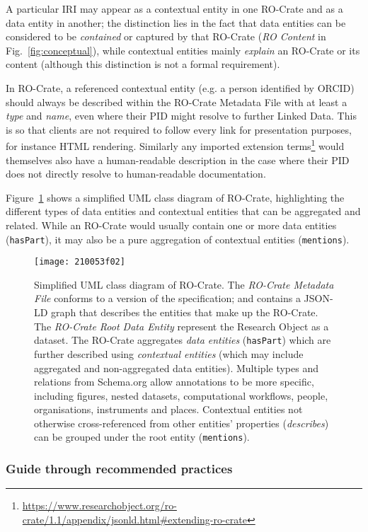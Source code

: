 \documentclass[ds,v1.1.2,openaccess]{iosart2x}%
\begin{document}
A particular IRI may appear as a contextual entity in one RO-Crate and
as a data entity in another; the distinction lies in the fact that data
entities can be considered to be \textit{contained} or captured by that
RO-Crate (\textit{RO Content} in Fig.~\ref{fig:conceptual}), while
contextual entities mainly \textit{explain} an RO-Crate or its content
(although this distinction is not a formal requirement).

In RO-Crate, a referenced contextual entity (e.g. a person identified
by ORCID) should always be described within the RO-Crate Metadata File
with at least a \textit{type} and \textit{name}, even where their PID might resolve
to further Linked Data. This is so that clients are not required to
follow every link for presentation purposes, for instance HTML
rendering. Similarly any imported extension
terms\footnote{\url{https://www.researchobject.org/ro-crate/1.1/appendix/jsonld.html\#extending-ro-crate}}
would themselves also have a human-readable description in the case
where their PID does not directly resolve to human-readable documentation.

Figure~\ref{fig:uml} shows a simplified UML class diagram of RO-Crate,
highlighting the different types of data entities and contextual
entities that can be aggregated and related. While an RO-Crate would
usually contain one or more data entities (\texttt{hasPart}), it may also be a
pure aggregation of contextual entities (\texttt{mentions}).

\begin{figure}%
\texttt{[image: 210053f02]}
\caption{Simplified UML class diagram of RO-Crate. The \emph
{RO-Crate Metadata File} conforms to a version of the specification;
and contains a JSON-LD graph \cite{sporny_2014} that describes the
entities that make up the RO-Crate. The \emph{RO-Crate Root Data
Entity} represent the Research Object as a dataset. The RO-Crate
aggregates \emph{data entities} (\texttt{hasPart}) which are further
described using \emph{contextual entities} (which may include
aggregated and non-aggregated data entities). Multiple types and
relations from Schema.org allow annotations to be more specific,
including figures, nested datasets, computational workflows, people,
organisations, instruments and places. Contextual entities not
otherwise cross-referenced from other entities' properties (\emph
{describes}) can be grouped under the root entity (\texttt{mentions}).}
\label{fig:uml}
\end{figure}

\subsubsection{Guide through recommended practices}%
\end{document}
